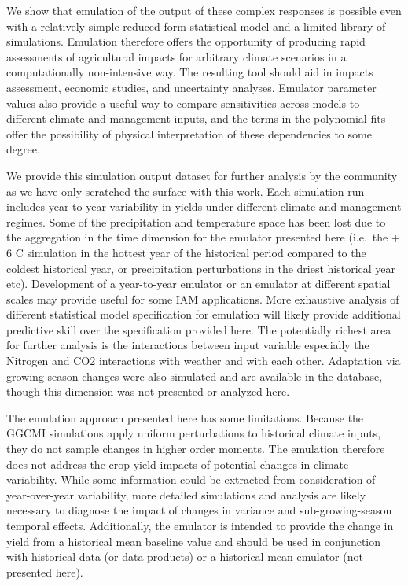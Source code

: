 \documentclass[preprint, 5p, times, twocolumn]{elsarticle}
\begin{document}
We show that emulation of the output of these complex responses is possible even with a relatively simple reduced-form statistical model and a limited library of simulations. Emulation therefore offers the opportunity of producing rapid assessments of agricultural impacts for arbitrary climate scenarios in a computationally non-intensive way. The resulting tool should aid in impacts assessment, economic studies, and uncertainty analyses. Emulator parameter values also provide a useful way to compare sensitivities across models to different climate and management inputs, and the terms in the polynomial fits offer the possibility of physical interpretation of these dependencies to some degree.

We provide this simulation output dataset for further analysis by the community as we have only scratched the surface with this work. Each simulation run includes year to year variability in yields under different climate and management regimes. Some of the precipitation and temperature space has been lost due to the aggregation in the time dimension for the emulator presented here (i.e.\ the + 6 C simulation in the hottest year of the historical period compared to the coldest historical year, or precipitation perturbations in the driest historical year etc). Development of a year-to-year emulator or an emulator at different spatial scales may provide useful for some IAM applications. More exhaustive analysis of different statistical model specification for emulation will likely provide additional predictive skill over the specification provided here. The potentially richest area for further analysis is the interactions between input variable especially the Nitrogen and CO2 interactions with weather and with each other. Adaptation via growing season changes were also simulated and are available in the database, though this dimension was not presented or analyzed here.

The emulation approach presented here has some limitations. Because the GGCMI simulations apply uniform perturbations to historical climate inputs, they do not sample changes in higher order moments. The emulation therefore does not address the crop yield impacts of potential changes in climate variability. While some information could be extracted from consideration of year-over-year variability, more detailed simulations and analysis are likely necessary to diagnose the impact of changes in variance and sub-growing-season temporal effects. Additionally, the emulator is intended to provide the change in yield from a historical mean baseline value and should be used in conjunction with historical data (or data products) or a historical mean emulator (not presented here).
\end{document}
